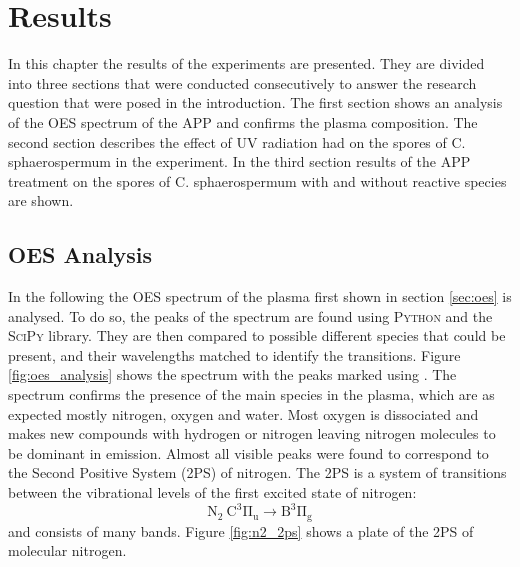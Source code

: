 \chapter{Results}
\label{chap:results}
In this chapter the results of the experiments are presented. They are divided into three sections that were conducted consecutively to answer the research question that were posed in the introduction. The first section shows an analysis of the OES spectrum of the APP and confirms the plasma composition. The second section describes the effect of UV radiation had on the spores of C. sphaerospermum in the experiment. In the third section results of the APP treatment on the spores of C. sphaerospermum with and without reactive species are shown. 

\section{OES Analysis}
\label{sec:oes_analysis}
In the following the OES spectrum of the plasma first shown in section \ref{sec:oes} is analysed. To do so, the peaks of the spectrum are found using \textsc{Python} and the \textsc{SciPy} library. They are then compared to possible different species that could be present, and their wavelengths matched to identify the transitions. Figure \ref{fig:oes_analysis} shows the spectrum with the peaks marked using \cite{nist, spectra, spectrum}. The spectrum confirms the presence of the main species in the plasma, which are as expected mostly nitrogen, oxygen and water. Most oxygen is dissociated and makes new compounds with hydrogen or nitrogen leaving nitrogen molecules to be dominant in emission. Almost all visible peaks were found to correspond to the Second Positive System (2PS) of nitrogen. The 2PS is a system of transitions between the vibrational levels of the first excited state of nitrogen:
\begin{equation}
    \mathrm{N_2\ C^3\Pi_u \rightarrow B^3\Pi_g}
\end{equation}
and consists of many bands. Figure \ref{fig:n2_2ps} shows a plate of the 2PS of molecular nitrogen.


